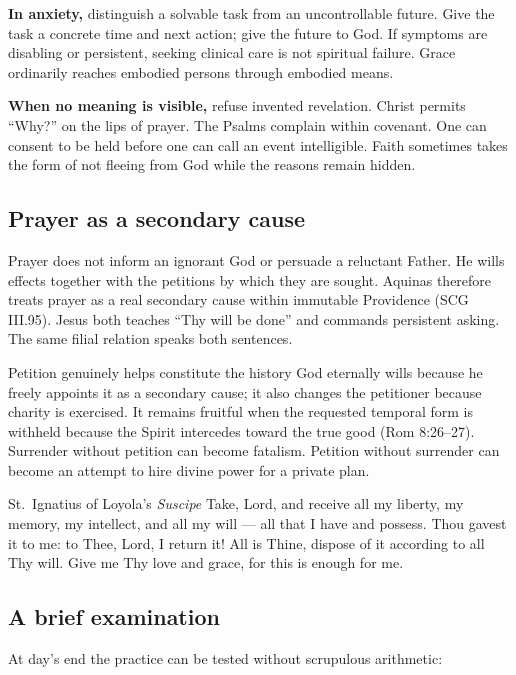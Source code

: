 \textbf{In anxiety,} distinguish a solvable task from an uncontrollable future. Give the task a concrete time and next action; give the future to God. If symptoms are disabling or persistent, seeking clinical care is not spiritual failure. Grace ordinarily reaches embodied persons through embodied means.

\textbf{When no meaning is visible,} refuse invented revelation. Christ permits ``Why?'' on the lips of prayer. The Psalms complain within covenant. One can consent to be held before one can call an event intelligible. Faith sometimes takes the form of not fleeing from God while the reasons remain hidden.

\subsection{Prayer as a secondary cause}

Prayer does not inform an ignorant God or persuade a reluctant Father. He wills effects together with the petitions by which they are sought. Aquinas therefore treats prayer as a real secondary cause within immutable Providence (SCG III.95). Jesus both teaches ``Thy will be done'' and commands persistent asking. The same filial relation speaks both sentences.

Petition genuinely helps constitute the history God eternally wills because he freely appoints it as a secondary cause; it also changes the petitioner because charity is exercised. It remains fruitful when the requested temporal form is withheld because the Spirit intercedes toward the true good (Rom 8:26--27). Surrender without petition can become fatalism. Petition without surrender can become an attempt to hire divine power for a private plan.

\begin{massbox}{St.~Ignatius of Loyola's \emph{Suscipe}}
Take, Lord, and receive all my liberty, my memory, my intellect, and all my will --- all that I have and possess. Thou gavest it to me: to Thee, Lord, I return it! All is Thine, dispose of it according to all Thy will. Give me Thy love and grace, for this is enough for me.
\end{massbox}

\subsection{A brief examination}

At day's end the practice can be tested without scrupulous arithmetic:

